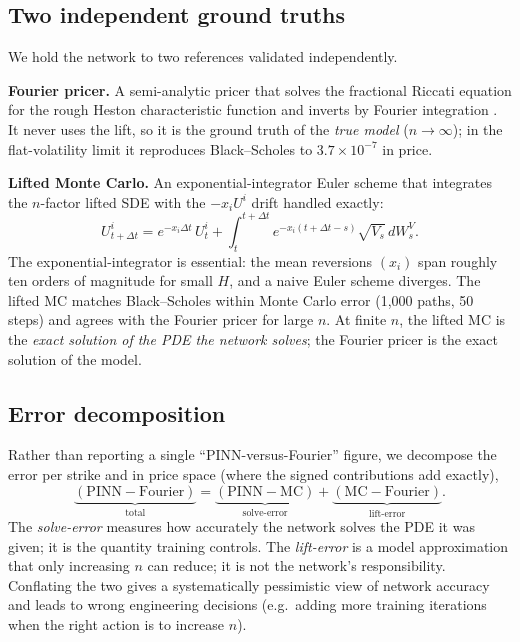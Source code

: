 \documentclass[review,12pt]{elsarticle}
\begin{document}
\subsection{Two independent ground truths}
We hold the network to two references validated independently.

\textbf{Fourier pricer.}  A semi-analytic pricer that solves the fractional Riccati
equation for the rough Heston characteristic function
\citep{eleuch2019characteristic} and inverts by Fourier integration
\citep{carr1999option}.  It never uses the lift, so it is the ground truth of the
\emph{true model} ($n\to\infty$); in the flat-volatility limit it reproduces
Black--Scholes to $3.7\times10^{-7}$ in price.

\textbf{Lifted Monte Carlo.}  An exponential-integrator Euler scheme that integrates
the $n$-factor lifted SDE with the $-x_i U^i$ drift handled exactly:
\begin{equation}
  U^i_{t+\Delta t} = e^{-x_i\Delta t}\,U^i_t
    + \int_t^{t+\Delta t}e^{-x_i(t+\Delta t - s)}\sqrt{V_s}\,dW^V_s.
  \label{eq:expint}
\end{equation}
The exponential-integrator is essential: the mean reversions $(x_i)$ span roughly
ten orders of magnitude for small $H$, and a naive Euler scheme diverges.  The
lifted MC matches Black--Scholes within Monte Carlo error (1,000 paths, 50 steps)
and agrees with the Fourier pricer for large $n$.  At finite $n$, the lifted MC is
the \emph{exact solution of the PDE the network solves}; the Fourier pricer is the
exact solution of the model.

\subsection{Error decomposition}
\label{sec:decomp}
Rather than reporting a single ``PINN-versus-Fourier'' figure, we decompose the
error per strike and in price space (where the signed contributions add exactly),
\begin{equation}
  \underbrace{(\mathrm{PINN}-\mathrm{Fourier})}_{\text{total}}
  =\underbrace{(\mathrm{PINN}-\mathrm{MC})}_{\text{solve-error}}
  +\underbrace{(\mathrm{MC}-\mathrm{Fourier})}_{\text{lift-error}}.
  \label{eq:split}
\end{equation}
The \emph{solve-error} measures how accurately the network solves the PDE it was
given; it is the quantity training controls.  The \emph{lift-error} is a model
approximation that only increasing $n$ can reduce; it is not the network's
responsibility.  Conflating the two gives a systematically pessimistic view of
network accuracy and leads to wrong engineering decisions (e.g.\ adding more
training iterations when the right action is to increase $n$).
\end{document}
